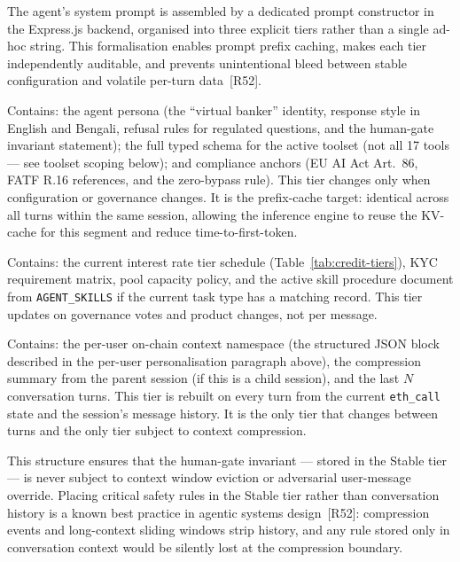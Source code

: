 \documentclass[12pt,a4paper]{report}
\begin{document}
The agent's system prompt is assembled by a dedicated prompt constructor in the
Express.js backend, organised into three explicit tiers rather than a single
ad-hoc string. This formalisation enables prompt prefix caching, makes each tier
independently auditable, and prevents unintentional bleed between stable
configuration and volatile per-turn data~[R52].

\begin{description}[noitemsep,leftmargin=0pt]
\item[\textbf{Stable tier.}] Contains: the agent persona (the ``virtual banker''
identity, response style in English and Bengali, refusal rules for regulated
questions, and the human-gate invariant statement); the full typed schema for the
active toolset (not all 17 tools --- see toolset scoping below); and compliance
anchors (EU AI Act Art.~86, FATF R.16 references, and the zero-bypass rule). This
tier changes only when configuration or governance changes. It is the prefix-cache
target: identical across all turns within the same session, allowing the inference
engine to reuse the KV-cache for this segment and reduce time-to-first-token.

\item[\textbf{Context tier.}] Contains: the current interest rate tier schedule
(Table~\ref{tab:credit-tiers}), KYC requirement matrix, pool capacity policy, and
the active skill procedure document from \texttt{AGENT\_SKILLS} if the current
task type has a matching record. This tier updates on governance votes and product
changes, not per message.

\item[\textbf{Volatile tier.}] Contains: the per-user on-chain context namespace
(the structured JSON block described in the per-user personalisation paragraph
above), the compression summary from the parent session (if this is a child
session), and the last $N$ conversation turns. This tier is rebuilt on every
turn from the current \texttt{eth\_call} state and the session's message history.
It is the only tier that changes between turns and the only tier subject to context
compression.
\end{description}

\noindent This structure ensures that the human-gate invariant --- stored in the
Stable tier --- is never subject to context window eviction or adversarial
user-message override. Placing critical safety rules in the Stable tier rather than
conversation history is a known best practice in agentic systems
design~[R52]: compression events and long-context sliding windows
strip history, and any rule stored only in conversation context would be silently
lost at the compression boundary.
\end{document}
